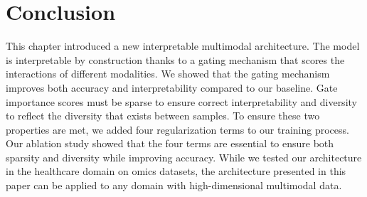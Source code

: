 \documentclass[../main.tex]{subfiles}
\begin{document}
\section{Conclusion}
	This chapter introduced a new interpretable multimodal architecture.
	The model is interpretable by construction thanks to a gating mechanism that scores the interactions of different modalities.
	We showed that the gating mechanism improves both accuracy and interpretability compared to our baseline.
	Gate importance scores must be sparse to ensure correct interpretability and diversity to reflect the diversity that exists between samples.
	To ensure these two properties are met, we added four regularization terms to our training process.
	Our ablation study showed that the four terms are essential to ensure both sparsity and diversity while improving accuracy.
	While we tested our architecture in the healthcare domain on omics datasets, the architecture presented in this paper can be applied to any domain with high-dimensional multimodal data.
\end{document}

